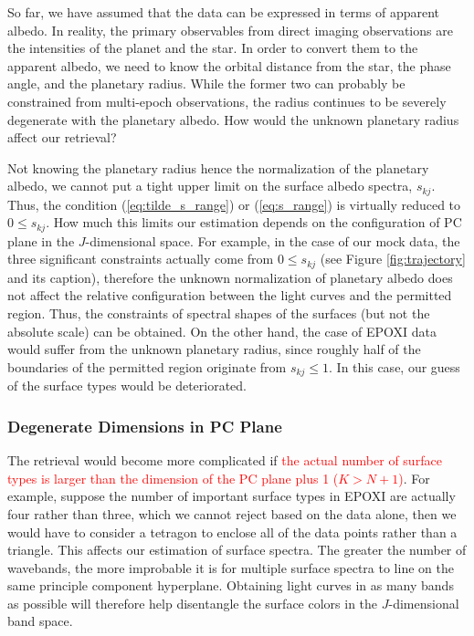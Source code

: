 \documentclass[iop,numberedappendix,apj]{emulateapj}
\def\edit#1{\textcolor{red}{#1}}
\def\memoYF#1{\color{red}[YF: {\bf #1}]\color{black}}
\begin{document}
So far, we have assumed that the data can be expressed in terms of apparent albedo. 
In reality, the primary observables from direct imaging observations are the intensities of the planet and the star. 
In order to convert them to the apparent albedo, we need to know the orbital distance from the star, the phase angle, and the planetary radius. 
While the former two can probably be constrained from multi-epoch observations, the radius continues to be severely degenerate with the planetary albedo. 
How would the unknown planetary radius affect our retrieval? 

Not knowing the planetary radius hence the normalization of the planetary albedo, we cannot put a tight upper limit on the surface albedo spectra, $s_{kj}$. 
Thus, the condition (\ref{eq:tilde_s_range}) or (\ref{eq:s_range}) is virtually reduced to $0 \leq s_{kj}$. 
How much this limits our estimation depends on the configuration of PC plane in the $J$-dimensional space. 
For example, in the case of our mock data, the three significant constraints actually come from $0 \leq s_{kj}$ (see Figure \ref{fig:trajectory} and its caption), therefore the unknown normalization of planetary albedo does not affect the relative configuration between the light curves and the permitted region. 
Thus, the constraints of spectral shapes of the surfaces (but not the absolute scale) can be obtained. 
On the other hand, the case of EPOXI data would suffer from the unknown planetary radius, since roughly half of the boundaries of the permitted region originate from $ s_{kj} \leq 1$. 
In this case, our guess of the surface types would be deteriorated. 


\subsubsection{Degenerate Dimensions in PC Plane}

The retrieval would become more complicated if \edit{the actual number of surface types is larger than the dimension of the PC plane plus 1 ($K > N + 1 $)}. 
For example, suppose the number of important surface types in EPOXI are actually four rather than three, which we cannot reject based on the data alone, then we would have to consider a tetragon to enclose all of the data points rather than a triangle. 
This affects our estimation of surface spectra. 
The greater the number of wavebands, the more improbable it is for multiple surface spectra to line on the same principle component hyperplane. 
Obtaining light curves in as many bands as possible will therefore help disentangle the surface colors in the $J$-dimensional band space. 
\end{document}
